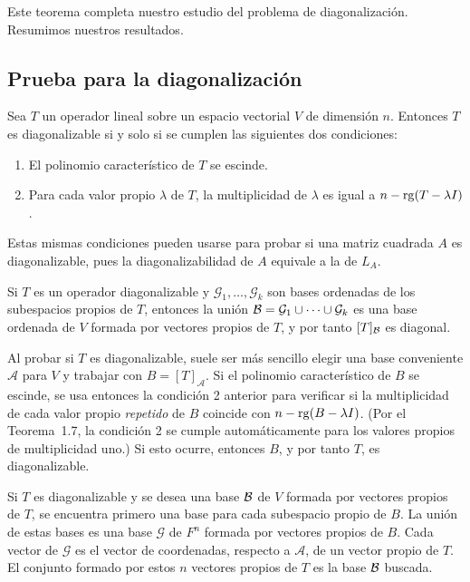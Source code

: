 \documentclass[12pt,a4paper]{book}
\begin{document}
    Este teorema completa nuestro estudio del problema de diagonalización. Resumimos nuestros resultados.

    \subsection*{Prueba para la diagonalización}

    Sea $T$ un operador lineal sobre un espacio vectorial $V$ de dimensión $n$. Entonces $T$ es diagonalizable si y solo si se cumplen las siguientes dos condiciones:
    \begin{enumerate}
        \item El polinomio característico de $T$ se escinde.
        \item Para cada valor propio $\lambda$ de $T$, la multiplicidad de $\lambda$ es igual a $n-\operatorname{rg}(T-\lambda I)$.
    \end{enumerate}

    Estas mismas condiciones pueden usarse para probar si una matriz cuadrada $A$ es diagonalizable, pues la diagonalizabilidad de $A$ equivale a la de $L_A$.

    Si $T$ es un operador diagonalizable y $\mathcal{G}_1,\dots,\mathcal{G}_k$ son bases ordenadas de los subespacios propios de $T$, entonces la unión $\mathcal{B}=\mathcal{G}_1\cup\cdots\cup\mathcal{G}_k$ es una base ordenada de $V$ formada por vectores propios de $T$, y por tanto $[T]_{\mathcal{B}}$ es diagonal.

    Al probar si $T$ es diagonalizable, suele ser más sencillo elegir una base conveniente $\mathcal{A}$ para $V$ y trabajar con $B=[T]_{\mathcal{A}}$. Si el polinomio característico de $B$ se escinde, se usa entonces la condición 2 anterior para verificar si la multiplicidad de cada valor propio \textit{repetido} de $B$ coincide con $n-\operatorname{rg}(B-\lambda I)$. (Por el Teorema~1.7, la condición 2 se cumple automáticamente para los valores propios de multiplicidad uno.) Si esto ocurre, entonces $B$, y por tanto $T$, es diagonalizable.

    Si $T$ es diagonalizable y se desea una base $\mathcal{B}$ de $V$ formada por vectores propios de $T$, se encuentra primero una base para cada subespacio propio de $B$. La unión de estas bases es una base $\mathcal{G}$ de $F^n$ formada por vectores propios de $B$. Cada vector de $\mathcal{G}$ es el vector de coordenadas, respecto a $\mathcal{A}$, de un vector propio de $T$. El conjunto formado por estos $n$ vectores propios de $T$ es la base $\mathcal{B}$ buscada.
\end{document}
